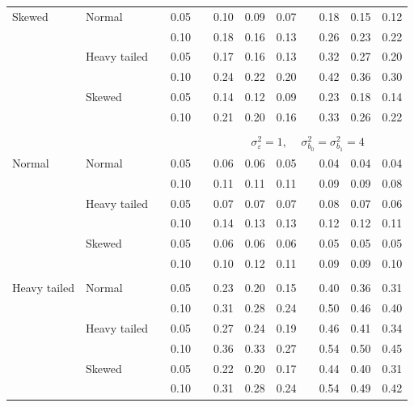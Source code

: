 \documentclass[12pt]{article} %
\begin{document}
\begin{table}[ht]
\begin{scriptsize}
\begin{center}
\begin{tabular}{ll p{.1cm} c p{.1cm} rrr p{.1cm} rrr}
Skewed       & Normal       && 0.05 &&  0.10 & 0.09 & 0.07 && 0.18 & 0.15 & 0.12 \\ 
             &              && 0.10 &&  0.18 & 0.16 & 0.13 && 0.26 & 0.23 & 0.22 \\ 
             & Heavy tailed && 0.05 &&  0.17 & 0.16 & 0.13 && 0.32 & 0.27 & 0.20 \\ 
             &              && 0.10 &&  0.24 & 0.22 & 0.20 && 0.42 & 0.36 & 0.30 \\ 
             & Skewed       && 0.05 &&  0.14 & 0.12 & 0.09 && 0.23 & 0.18 & 0.14 \\ 
             &              && 0.10 &&  0.21 & 0.20 & 0.16 && 0.33 & 0.26 & 0.22 \\ 


&&&&&&&&&&&\\
& && && \multicolumn{7}{c}{$\sigma_{\varepsilon}^2 = 1$, \ \ $\sigma_{b_0}^2 = \sigma_{b_1}^2 = 4$} \\ \cline{6-12}
\rowcolor{gray!20}Normal       & Normal       && 0.05 &&  0.06 & 0.06 & 0.05 && 0.04 & 0.04 & 0.04 \\ 
\rowcolor{gray!20}             &              && 0.10 &&  0.11 & 0.11 & 0.11 && 0.09 & 0.09 & 0.08 \\ 
\rowcolor{gray!20}             & Heavy tailed && 0.05 &&  0.07 & 0.07 & 0.07 && 0.08 & 0.07 & 0.06 \\ 
\rowcolor{gray!20}             &              && 0.10 &&  0.14 & 0.13 & 0.13 && 0.12 & 0.12 & 0.11 \\ 
\rowcolor{gray!20}             & Skewed       && 0.05 &&  0.06 & 0.06 & 0.06 && 0.05 & 0.05 & 0.05 \\ 
\rowcolor{gray!20}             &              && 0.10 &&  0.10 & 0.12 & 0.11 && 0.09 & 0.09 & 0.10 \\ 
             &&&&&&&&&&&\\
Heavy tailed & Normal       && 0.05 &&  0.23 & 0.20 & 0.15 && 0.40 & 0.36 & 0.31 \\ 
             &              && 0.10 &&  0.31 & 0.28 & 0.24 && 0.50 & 0.46 & 0.40 \\ 
             & Heavy tailed && 0.05 &&  0.27 & 0.24 & 0.19 && 0.46 & 0.41 & 0.34 \\ 
             &              && 0.10 &&  0.36 & 0.33 & 0.27 && 0.54 & 0.50 & 0.45 \\ 
             & Skewed       && 0.05 &&  0.22 & 0.20 & 0.17 && 0.44 & 0.40 & 0.31 \\ 
             &              && 0.10 &&  0.31 & 0.28 & 0.24 && 0.54 & 0.49 & 0.42 \\ 

\end{tabular}
\end{center}
\end{scriptsize}
\end{table}
\end{document}
